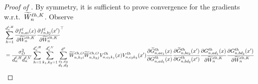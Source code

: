 \begin{proof}[Proof of ]
    By symmetry, it is sufficient to prove convergence for the gradients w.r.t.\ $\widetilde{W}_n^{\ell h, K}$.
    Observe
    \begin{align*}
        &\sum_{h = 1}^{d_{n}^{\ell, H}}
            \frac{
                \partial {f}^{\ell}_{n, a i}{(x)}
            }{
                \partial \widetilde{W}_n^{\ell h, K}
            }
            \frac{
                \partial {f}^{\ell}_{n, b j}{(x')}
            }{
                \partial \widetilde{W}_n^{\ell h, K}
            }^\top
        \\
        &=
        \frac{\sigma_{O}^2}{d_{n}^{\ell, H} d_{n}^{\ell, V}}
        \sum_{h = 1}^{d_{n}^{\ell, H}}
        \sum_{k_1, k_2 = 1}^{d_{n}^{\ell, V}}
        \sum_{\substack{c_1, c_2 \\ d_1, d_2}}^{d^s}
            \widetilde{W}_{n, k_1 i}^{\ell h, O}
            \widetilde{W}_{n, k_2 j}^{\ell h, O}
            V_{n, c_1 k_1}^{\ell h} (x)
            V_{n, c_2 k_2}^{\ell h} (x')
            \frac{
                \partial
                \widetilde{G}_{n, a c_1}^{\ell h} (x)
            }{
                \partial
                G_{n, a d_1}^{\ell h}(x)
            }
            \frac{
                \partial
                \widetilde{G}_{n, b c_2}^{\ell h} (x')
            }{
                \partial
                G_{n, b d_2}^{\ell h}(x')
            }
            \frac{
                \partial
                G_{n, a d_1}^{\ell h}(x)
            }{
                \partial \widetilde{W}_n^{\ell h, K}
            }
            \frac{
                \partial
                G_{n, b d_2}^{\ell h}(x')
            }{
                \partial \widetilde{W}_n^{\ell h, K}
}
\end{align*}
\end{proof}
